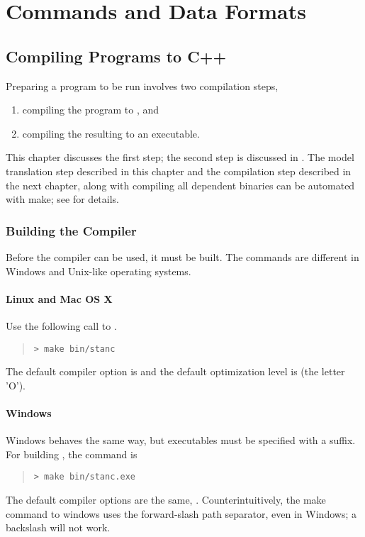 \part{Commands and Data Formats}


\chapter{Compiling \Stan Programs to C++}\label{stanc.chapter}

\noindent 
Preparing a \Stan program to be run involves two compilation steps,
%
\begin{enumerate}
\item compiling the \Stan program to \Cpp, and
\item compiling the resulting \Cpp to an executable.
\end{enumerate}
%
This chapter discusses the first step; the second step is discussed in
.  The model translation step described in
this chapter and the \Cpp compilation step described in the next
chapter, along with compiling all dependent binaries can be automated
with make; see  for details.

\section{Building the \stanc Compiler}

Before the \stanc compiler can be used, it must be built.  The
commands are different in Windows and Unix-like operating systems.

\subsection{Linux and Mac OS X}

Use the following call to .%
%
%
\begin{quote}
\begin{Verbatim}[fontshape=sl]
> make bin/stanc
\end{Verbatim}
\end{quote}
%
The default compiler option is  and the default
optimization level is  (the letter 'O').

\subsection{Windows}

Windows behaves the same way, but executables must be specified
with a  suffix.  For building \stanc, the command is
%
\begin{quote}
\begin{Verbatim}[fontshape=sl]
> make bin/stanc.exe
\end{Verbatim}
\end{quote}
%
The default compiler options are the same,  .
Counterintuitively, the make command to windows uses the forward-slash
path separator, even in Windows; a backslash will not work.


